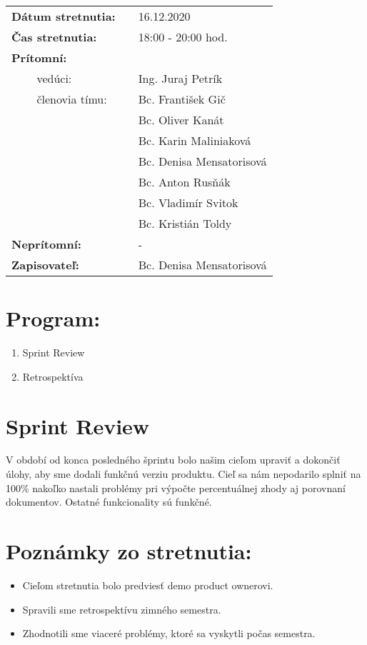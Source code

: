 \documentclass{article}
\begin{document}
    

    \begin{table}[h]
        \begin{tabular}{lllll}
            \multicolumn{3}{l}{\textbf{Dátum stretnutia:}} & & 16.12.2020 \\
            \multicolumn{3}{l}{\textbf{Čas stretnutia:}} & & 18:00 - 20:00 hod. \\
            \multicolumn{3}{l}{\textbf{Prítomní:}} \\
            & & vedúci: & & Ing. Juraj Petrík \\
            & & členovia tímu: & & Bc. František Gič  \\
            & & & & Bc. Oliver Kanát \\
            & & & & Bc. Karin Maliniaková \\
            & & & & Bc. Denisa Mensatorisová \\
            & & & & Bc. Anton Rusňák \\
            & & & & Bc. Vladimír Svitok \\
            & & & & Bc. Kristián Toldy \\
            \multicolumn{3}{l}{\textbf{Neprítomní:}} & & -\\
            \multicolumn{3}{l}{\textbf{Zapisovateľ:}} & & Bc. Denisa Mensatorisová \\
        \end{tabular}
        \label{tab:grades}
    \end{table}

    \section*{Program:}
    
    \begin{enumerate}
        \item Sprint Review
        \item Retrospektíva
    \end{enumerate}

    \section*{Sprint Review}

        \textnormal {V období od konca posledného šprintu bolo našim cieľom upraviť a dokončiť úlohy, aby sme dodali funkčnú verziu produktu.
        Cieľ sa nám nepodarilo splniť na 100\% nakoľko nastali problémy pri výpočte percentuálnej zhody aj porovnaní dokumentov. Ostatné funkcionality sú funkčné. }

    \section*{Poznámky zo stretnutia:}

    \begin{itemize}
        \item Cieľom stretnutia bolo predviesť demo product ownerovi.
        \item Spravili sme retrospektívu zimného semestra.
        \item Zhodnotili sme viaceré problémy, ktoré sa vyskytli počas semestra. 
    \end{itemize}
\end{document}

